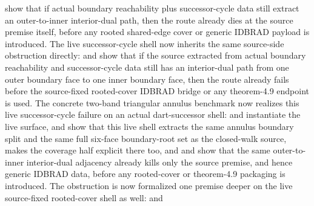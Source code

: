 \documentclass[11pt]{article}
\begin{document}
\begin{itemize}
show that if actual boundary reachability plus successor-cycle data still
extract an outer-to-inner interior-dual path, then the route already dies at
the source  premise itself, before any rooted shared-edge cover
or generic IDBRAD payload is introduced.
The live successor-cycle shell now inherits the same source-side obstruction
directly:
and
show that if the source extracted from actual boundary reachability and
successor-cycle data still has an interior-dual path from one outer boundary
face to one inner boundary face, then the route already fails before the
source-fixed rooted-cover IDBRAD bridge or any theorem-4.9 endpoint is used.
The concrete two-band triangular annulus benchmark now realizes this live
successor-cycle failure on an actual dart-successor shell:
 and
instantiate the live surface,
 and
 show that this live shell
extracts the same annulus boundary split and the same full six-face
boundary-root set as the closed-walk source,
 makes the coverage
half explicit there too, and
and
show that the same outer-to-inner interior-dual adjacency already kills only
the source  premise, and hence generic IDBRAD data, before any
rooted-cover or theorem-4.9 packaging is introduced.
The obstruction is now formalized one premise deeper on the live source-fixed
rooted-cover shell as well:
and

\end{itemize}
\end{document}
